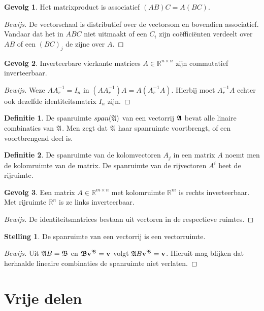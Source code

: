 \documentclass{amsart}
\theoremstyle{definition}
\newtheorem{thm}{Stelling}[section]
\newtheorem{dfn}{Definitie}[section]
\newtheorem{csq}{Gevolg}[section]
\newenvironment{bewijs}{\begin{proof}[Bewijs]}{\end{proof}}
\newcommand{\realnums}{\mathbb{R}}
\newcommand{\realn}[1][n]{\realnums^{#1}}
\newcommand{\realmx}[2][n]{\realn[#2 \times #1]}
\newcommand{\realnxn}{\realmx{n}}
\newcommand{\realmxn}{\realmx{m}}
\newcommand{\vvec}[1][v]{\mathbf{#1}}
\newcommand{\vecrow}[1][a]{\mathfrak{\MakeUppercase{#1}}}
\newcommand{\cvec}[2]{{#1}^{#2}}
\newcommand{\cvecv}[2][v]{\cvec{\vvec[#1]}{#2}}
\newcommand{\cvecva}[1][a]{\cvecv{\vecrow[#1]}}
\begin{document}
\begin{csq}
	Het matrixproduct is associatief $(AB)C = A(BC)$.
	\begin{bewijs}
		De vectorschaal is distributief over de vectorsom en bovendien associatief.
		Vandaar dat het in $ABC$ niet uitmaakt of een $C_i$ zijn coëfficiënten verdeelt over $AB$ of een $(BC)_j$ de zijne over $A$.
	\end{bewijs}
\end{csq}

\begin{csq}
	Inverteerbare vierkante matrices $A \in \realnxn$ zijn commutatief inverteerbaar.
	\begin{bewijs}
		Weze $AA^{-1}_r = I_n$ in $(AA^{-1}_r)A = A(A^{-1}_rA)$. Hierbij moet $A^{-1}_rA$ echter ook dezelfde identiteitsmatrix $I_n$ zijn.
	\end{bewijs}
\end{csq}

\begin{dfn}
	De spanruimte $span(\vecrow)$ van een vectorrij $\vecrow$ bevat alle linaire combinaties van $\vecrow$.
	Men zegt dat $\vecrow$ haar spanruimte voortbrengt, of een voortbrengend deel is.
\end{dfn}

\begin{dfn}
	De spanruimte van de kolomvectoren $A_j$ in een matrix $A$ noemt men de kolomruimte van de matrix.
	De spanruimte van de rijvectoren $A^i$ heet de rijruimte.
\end{dfn}

\begin{csq}
	Een matrix $A \in \realmxn$ met kolomruimte $\realn[m]$ is rechts inverteerbaar.
	Met rijruimte $\realn$ is ze links inverteerbaar.
	\begin{bewijs}
		De identiteitsmatrices bestaan uit vectoren in de respectieve ruimtes.
	\end{bewijs}
\end{csq}

\begin{thm}
	De spanruimte van een vectorrij is een vectorruimte.
	\begin{bewijs}
		Uit $\vecrow B = \vecrow[b]$ en $\vecrow[b] \cvecva[b]= \vvec$ volgt $\vecrow B \cvecva[b] = \vvec$.
		Hieruit mag blijken dat herhaalde lineaire combinaties de spanruimte niet verlaten.
	\end{bewijs}
\end{thm}

\section{Vrije delen}
\end{document}
